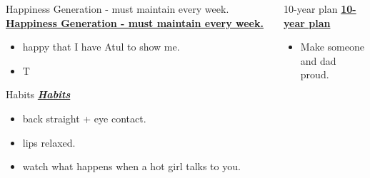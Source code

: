 \begin{multicols}{4}
\ifdefined\POSTER
  \begin{columns}
   \begin{column}{0.22\columnwidth}
      \begin{block}{Happiness Generation - must maintain every week.}
\else
 \underline{\bf Happiness Generation - must maintain every week.}
\fi
\begin{itemize}
          \tiny \item \tiny happy that I have Atul to show me.
          \item \tiny T
            \end{itemize}
\ifdefined\POSTER
      \end{block}
\fi

\ifdefined\POSTER
    \begin{block}{Habits}
\else
 \underline{\bf \it Habits}
\fi
      \begin{itemize}
        \tiny \item \tiny back straight + eye contact.
      \item \tiny lips relaxed.
      \item \tiny watch what happens when a hot girl talks to you.
      \end{itemize}
\ifdefined\POSTER
    \end{block}
  \end{column} %
\fi

\ifdefined\POSTER
  \begin{column}{0.5\columnwidth}
    \begin{block}{10-year plan}   %
\else
 \underline{\bf 10-year plan}
\fi
      \begin{itemize}
      \item \small Make someone and dad proud.
      \end{itemize}
\ifdefined\POSTER
    \end{block}
\fi


\end{column}
\end{columns}
\end{multicols}
